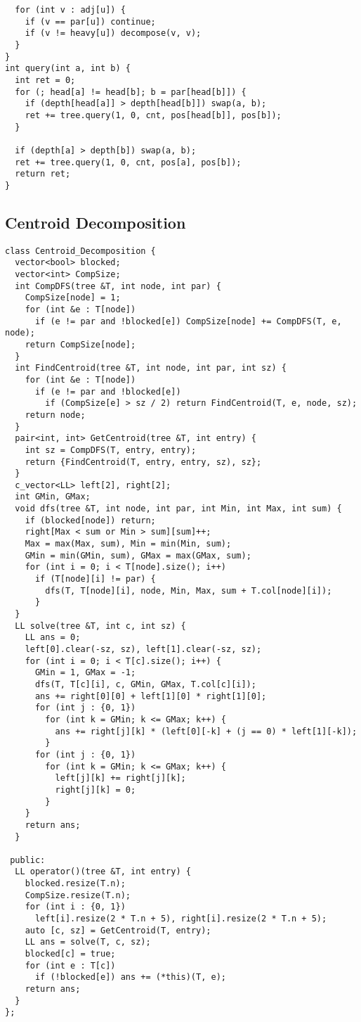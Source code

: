 \documentclass[FSZ,a4paper,onesided]{article}
\begin{document}
\begin{multicols*}{\COLS}
\begin{lstlisting}
  for (int v : adj[u]) {
    if (v == par[u]) continue;
    if (v != heavy[u]) decompose(v, v);
  }
}
int query(int a, int b) {
  int ret = 0;
  for (; head[a] != head[b]; b = par[head[b]]) {
    if (depth[head[a]] > depth[head[b]]) swap(a, b);
    ret += tree.query(1, 0, cnt, pos[head[b]], pos[b]);
  }

  if (depth[a] > depth[b]) swap(a, b);
  ret += tree.query(1, 0, cnt, pos[a], pos[b]);
  return ret;
}
\end{lstlisting}
\subsection{Centroid Decomposition}
\begin{lstlisting}
class Centroid_Decomposition {
  vector<bool> blocked;
  vector<int> CompSize;
  int CompDFS(tree &T, int node, int par) {
    CompSize[node] = 1;
    for (int &e : T[node])
      if (e != par and !blocked[e]) CompSize[node] += CompDFS(T, e, node);
    return CompSize[node];
  }
  int FindCentroid(tree &T, int node, int par, int sz) {
    for (int &e : T[node])
      if (e != par and !blocked[e])
        if (CompSize[e] > sz / 2) return FindCentroid(T, e, node, sz);
    return node;
  }
  pair<int, int> GetCentroid(tree &T, int entry) {
    int sz = CompDFS(T, entry, entry);
    return {FindCentroid(T, entry, entry, sz), sz};
  }
  c_vector<LL> left[2], right[2];
  int GMin, GMax;
  void dfs(tree &T, int node, int par, int Min, int Max, int sum) {
    if (blocked[node]) return;
    right[Max < sum or Min > sum][sum]++;
    Max = max(Max, sum), Min = min(Min, sum);
    GMin = min(GMin, sum), GMax = max(GMax, sum);
    for (int i = 0; i < T[node].size(); i++)
      if (T[node][i] != par) {
        dfs(T, T[node][i], node, Min, Max, sum + T.col[node][i]);
      }
  }
  LL solve(tree &T, int c, int sz) {
    LL ans = 0;
    left[0].clear(-sz, sz), left[1].clear(-sz, sz);
    for (int i = 0; i < T[c].size(); i++) {
      GMin = 1, GMax = -1;
      dfs(T, T[c][i], c, GMin, GMax, T.col[c][i]);
      ans += right[0][0] + left[1][0] * right[1][0];
      for (int j : {0, 1})
        for (int k = GMin; k <= GMax; k++) {
          ans += right[j][k] * (left[0][-k] + (j == 0) * left[1][-k]);
        }
      for (int j : {0, 1})
        for (int k = GMin; k <= GMax; k++) {
          left[j][k] += right[j][k];
          right[j][k] = 0;
        }
    }
    return ans;
  }

 public:
  LL operator()(tree &T, int entry) {
    blocked.resize(T.n);
    CompSize.resize(T.n);
    for (int i : {0, 1})
      left[i].resize(2 * T.n + 5), right[i].resize(2 * T.n + 5);
    auto [c, sz] = GetCentroid(T, entry);
    LL ans = solve(T, c, sz);
    blocked[c] = true;
    for (int e : T[c])
      if (!blocked[e]) ans += (*this)(T, e);
    return ans;
  }
};
\end{lstlisting}

\end{multicols*}
\end{document}
